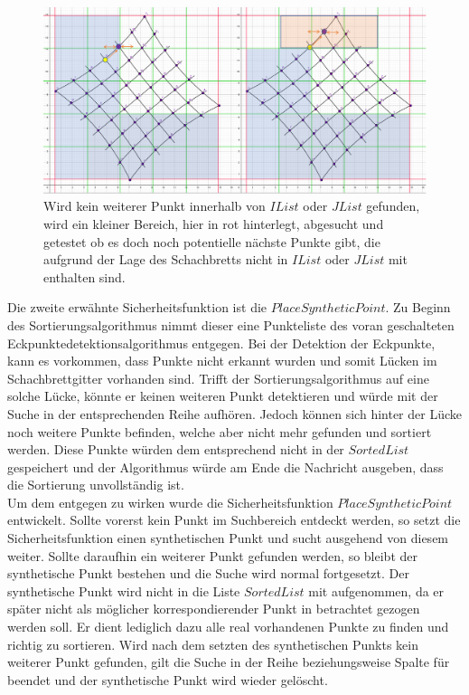 \begin{figure}[!htb]
	\centering
	\includegraphics[width=0.8\linewidth]{images/VerzeichnetesSchachbrett_6.png}
	\caption[Sicherheitsfunktion $SaftyList$]{Wird kein weiterer Punkt innerhalb von $IList$ oder $JList$ gefunden, wird ein kleiner Bereich, hier in rot hinterlegt, abgesucht und getestet ob es doch noch potentielle nächste Punkte gibt, die aufgrund der Lage des Schachbretts nicht in $IList$ oder $JList$ mit enthalten sind.}
	\label{fig:SaftyList}
\end{figure}


Die zweite erwähnte Sicherheitsfunktion ist die $PlaceSyntheticPoint$. Zu Beginn des Sortierungsalgorithmus nimmt dieser eine Punkteliste des voran geschalteten Eckpunktedetektionsalgorithmus entgegen. Bei der Detektion der Eckpunkte, kann es vorkommen, dass Punkte nicht erkannt wurden und somit Lücken im Schachbrettgitter vorhanden sind. Trifft der Sortierungsalgorithmus auf eine solche Lücke, könnte er keinen weiteren Punkt detektieren und würde mit der Suche in der entsprechenden Reihe aufhören. Jedoch können sich hinter der Lücke noch weitere Punkte befinden, welche aber nicht mehr gefunden und sortiert werden. Diese Punkte würden dem entsprechend nicht in der $SortedList$ gespeichert und der Algorithmus würde am Ende die Nachricht ausgeben, dass die Sortierung unvollständig ist.\\

Um dem entgegen zu wirken wurde die Sicherheitsfunktion $PlaceSyntheticPoint$ entwickelt. Sollte vorerst kein Punkt im Suchbereich entdeckt werden, so setzt die Sicherheitsfunktion einen synthetischen Punkt und sucht ausgehend von diesem weiter. Sollte daraufhin ein weiterer Punkt gefunden werden, so bleibt der synthetische Punkt bestehen und die Suche wird normal fortgesetzt. Der synthetische Punkt wird nicht in die Liste $SortedList$ mit aufgenommen, da er später nicht als möglicher korrespondierender Punkt in betrachtet gezogen werden soll. Er dient lediglich dazu alle real vorhandenen Punkte zu finden und richtig zu sortieren. Wird nach dem setzten des synthetischen Punkts kein weiterer Punkt gefunden, gilt die Suche in der Reihe beziehungsweise Spalte für beendet und der synthetische Punkt wird wieder gelöscht. \\


